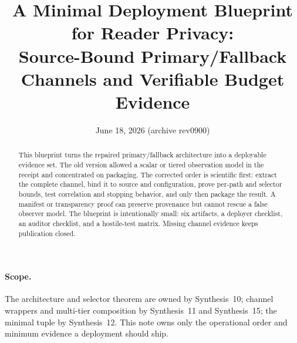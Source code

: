 \documentclass[11pt]{article}
\title{A Minimal Deployment Blueprint for Reader Privacy:\\
\large Source-Bound Primary/Fallback Channels and Verifiable Budget Evidence}
\author{}
\date{June 18, 2026 (archive rev0900)}
\begin{document}
\maketitle

\begin{abstract}
This blueprint turns the repaired primary/fallback architecture into a deployable evidence set. The old version allowed a scalar or tiered observation model in the receipt and concentrated on packaging. The corrected order is scientific first: extract the complete channel, bind it to source and configuration, prove per-path and selector bounds, test correlation and stopping behavior, and only then package the result. A manifest or transparency proof can preserve provenance but cannot rescue a false observer model. The blueprint is intentionally small: six artifacts, a deployer checklist, an auditor checklist, and a hostile-test matrix. Missing channel evidence keeps publication closed.
\end{abstract}

\paragraph{Scope.}
The architecture and selector theorem are owned by Synthesis~10; channel wrappers and multi-tier composition by Synthesis~11 and Synthesis~15; the minimal tuple by Synthesis~12. This note owns only the operational order and minimum evidence a deployment should ship.\cite{series:tieredpattern,series:obsatten,series:tieredobsvec,series:receiptitems}
\end{document}
